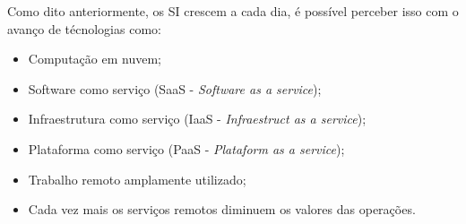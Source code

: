 \documentclass[
	12pt,				%
	openany,			%
	a4paper,			%
	chapter=TITLE,		%
	section=TITLE,		%
	english,
	brazil				%
]{abntex2}
\begin{document}

Como dito anteriormente, os SI crescem a cada dia, é possível perceber isso com o avanço de técnologias como:
	\begin{itemize}
		\item Computação em nuvem;
		\item Software como serviço (SaaS - \textit{Software as a service});
		\item Infraestrutura como serviço (IaaS - \textit{Infraestruct as a service});
		\item Plataforma como serviço (PaaS - \textit{Plataform as a service});
		\item Trabalho remoto amplamente utilizado;
		\item Cada vez mais os serviços remotos diminuem os valores das operações.
	\end{itemize}
\end{document}
